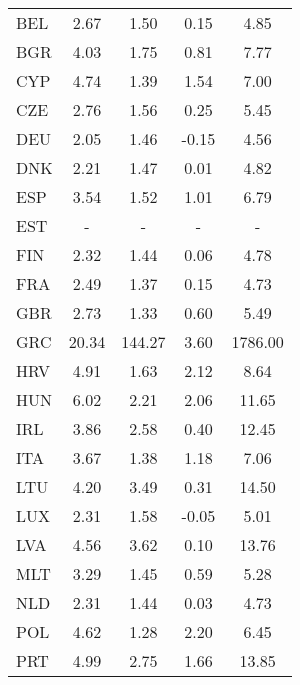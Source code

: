 \begin{table}[t!]
\begin{threeparttable}
{\begin{tabular}{l*{1}{cccc}}
BEL                 &        2.67&        1.50&        0.15&        4.85\\
BGR                 &        4.03&        1.75&        0.81&        7.77\\
CYP                 &        4.74&        1.39&        1.54&        7.00\\
CZE                 &        2.76&        1.56&        0.25&        5.45\\
DEU                 &        2.05&        1.46&       -0.15&        4.56\\
DNK                 &        2.21&        1.47&        0.01&        4.82\\
ESP                 &        3.54&        1.52&        1.01&        6.79\\
EST                &           -&           -&
-&-\\
FIN                 &        2.32&        1.44&        0.06&        4.78\\
FRA                 &        2.49&        1.37&        0.15&        4.73\\
GBR                 &        2.73&        1.33&        0.60&        5.49\\
GRC                 &       20.34&      144.27&        3.60&     1786.00\\
HRV                 &        4.91&        1.63&        2.12&        8.64\\
HUN                 &        6.02&        2.21&        2.06&       11.65\\
IRL                 &        3.86&        2.58&        0.40&       12.45\\
ITA                 &        3.67&        1.38&        1.18&        7.06\\
LTU                 &        4.20&        3.49&        0.31&       14.50\\
LUX                 &        2.31&        1.58&       -0.05&        5.01\\
LVA                 &        4.56&        3.62&        0.10&       13.76\\
MLT                 &        3.29&        1.45&        0.59&        5.28\\
NLD                 &        2.31&        1.44&        0.03&        4.73\\
POL                 &        4.62&        1.28&        2.20&        6.45\\
PRT                 &        4.99&        2.75&        1.66&       13.85\\

\end{tabular}}
\end{threeparttable}
\end{table}
